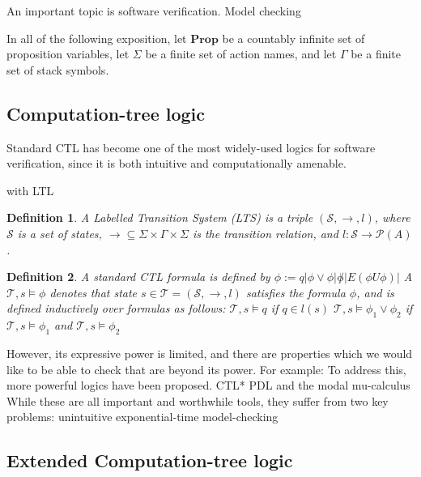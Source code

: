 \documentclass[11pt]{article}
\newtheorem{mydef}{Definition}
\begin{document}
An important topic 
is software verification.
Model checking




In all of the following exposition, let $\textbf{Prop}$ be a countably infinite
set of proposition variables, let $\Sigma$ be a finite set of action names, and
let $\Gamma$ be a finite set of stack symbols.

\subsection{Computation-tree logic}

Standard CTL has become %
one of the most widely-used logics for software verification, since it is both intuitive and computationally amenable.

with LTL

\begin{mydef}
A Labelled Transition System (LTS) is a triple $(\mathcal{S}, \rightarrow, l)$,
where $\mathcal{S}$ is a set of states, $\rightarrow \subseteq \Sigma \times
\Gamma \times \Sigma$ is the transition relation, and $l:\mathcal{S}
\rightarrow \mathcal{P}(A)$.
\end{mydef}

\begin{mydef}
A standard CTL formula is defined by
$\phi := q | \phi \vee \phi | \not \phi | E(\phi U \phi) | $%
A $\mathcal{T}, s \models \phi$ denotes that state $s \in \mathcal{T} = (\mathcal{S}, \rightarrow, l)$ satisfies the formula $\phi$, and is defined inductively over formulas as follows:
$\mathcal{T}, s \models q$ if $q \in l(s)$
$\mathcal{T}, s \models \phi_1 \vee \phi_2$ if $\mathcal{T}, s \models \phi_1$ and $\mathcal{T}, s \models \phi_2$
\end{mydef}

However, its expressive power is limited, and there are properties which we would like to be able to check that are beyond its power.
For example: 
To address this, more powerful logics have been proposed. CTL* %
 PDL %
and the modal mu-calculus
While these are all important and worthwhile tools, they suffer from two key problems: 
unintuitive
exponential-time model-checking


\subsection{Extended Computation-tree logic}
\end{document}
